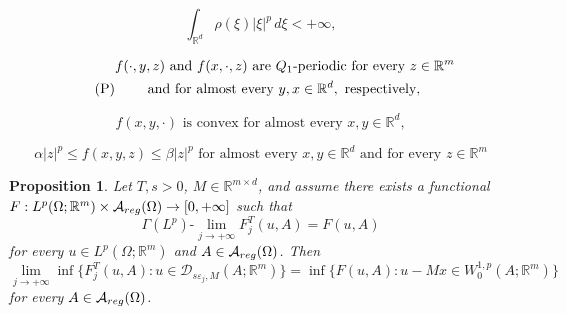 \documentclass[10pt,a4paper]{amsart}
\newtheorem{proposition}{Proposition}
\newcommand{\A}{\mathcal{A}}
\newcommand{\R}{\mathbb{R}}
\newcommand{\e}{\varepsilon}
\begin{document}
\begin{equation}\label{rho : moment}
\tag{$\rho_2$}
    \int_{\R^d}\rho(\xi)|\xi|^p\, d\xi <+\infty,
\end{equation}

\begin{align}  \notag
& f(\cdot,y,z) \text{ and } f(x,\cdot,z)  \text{ are } Q_1\text{-periodic for every } z\in \R^m \\ \label{f : period} \tag{P}
& \qquad\text{ and for almost every } y, x\in\R^d, \text{ respectively},
\end{align}

\begin{equation} \label{f : convex}
    \tag{C}
f(x,y,\cdot) \text{ is convex for almost every } x,y\in \R^d,
\end{equation}

\begin{equation} \label{f : growth}
    \tag{GC}
\alpha|z|^p\leq f(x,y,z)\leq \beta|z|^p \text{ for almost every } x,y\in \R^d \text{ and for every } z\in \R^m
\end{equation}

\begin{proposition}\label{prop : boundary} Let $T,s>0$, $M\in\R^{m\times d}$, and assume there exists a functional $F: L^p(\Omega;\R^m)\times \A_{\rm reg}(\Omega)\to[0,+\infty]$ such that 
\begin{equation*}
    \Gamma(L^p)\text{-}\lim_{j\to+\infty} F^T_j(u,A) = F(u,A) 
\end{equation*}
    for every $u\in L^p(\Omega; \R^m)$ and $A\in \A_{\rm reg}(\Omega)$. Then
    \begin{equation*}
        \lim_{j\to+\infty}\inf\{F^T_j(u,A) : u\in \mathcal{D}_{s\e_j,M}(A; \R^m)\} = \inf \{F(u,A) : u-Mx\in W^{1,p}_0(A; \R^m)\}
    \end{equation*}
    for every $A\in \A_{\rm reg}(\Omega)$.
\end{proposition}
\end{document}
